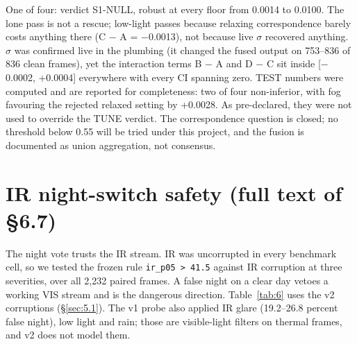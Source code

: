 \documentclass[10pt]{article}
\begin{document}
One of four: verdict S1-NULL, robust at every floor from 0.0014 to 0.0100. The lone pass is not a rescue; low-light passes because relaxing correspondence barely costs anything there (C $-$ A = $-$0.0013), not because live $\sigma$ recovered anything. $\sigma$ was confirmed live in the plumbing (it changed the fused output on 753--836 of 836 clean frames), yet the interaction terms B $-$ A and D $-$ C sit inside [$-$0.0002, +0.0004] everywhere with every CI spanning zero. TEST numbers were computed and are reported for completeness: two of four non-inferior, with fog favouring the rejected relaxed setting by +0.0028. As pre-declared, they were not used to override the TUNE verdict. The correspondence question is closed; no threshold below 0.55 will be tried under this project, and the fusion is documented as union aggregation, not consensus.

\FloatBarrier
\section{IR night-switch safety (full text of \S6.7)}\label{app:I}
The night vote trusts the IR stream. IR was uncorrupted in every benchmark cell, so we tested the frozen rule \texttt{ir\_\allowbreak{}p05 > 41.5} against IR corruption at three severities, over all 2,232 paired frames. A false night on a clear day vetoes a working VIS stream and is the dangerous direction. Table~\ref{tab:6} uses the v2 corruptions (\S\ref{sec:5.1}). The v1 probe also applied IR glare (19.2--26.8 percent false night), low light and rain; those are visible-light filters on thermal frames, and v2 does not model them.
\end{document}
